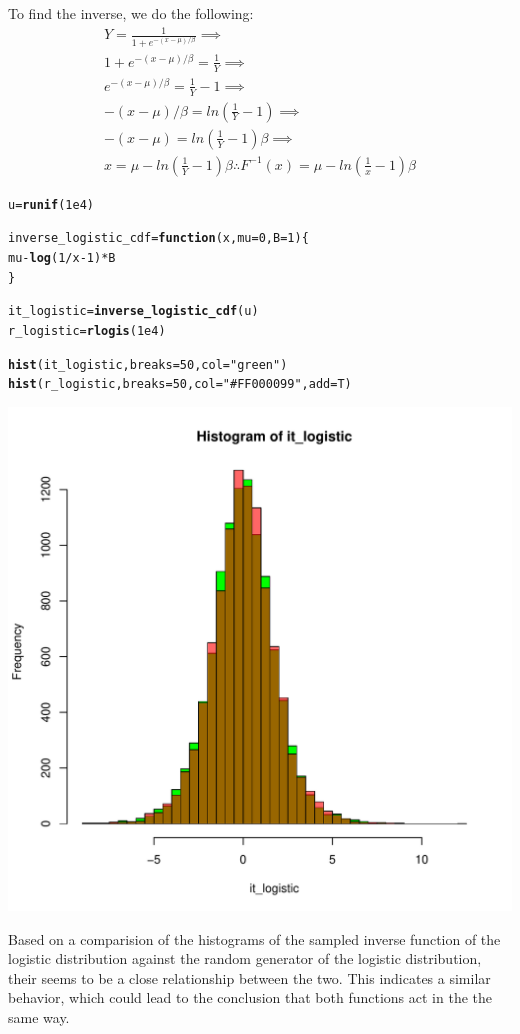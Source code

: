 \documentclass{article}\usepackage[]{graphicx}\usepackage[]{color}
\makeatletter
\newcommand{\hlnum}[1]{\textcolor[rgb]{0.686,0.059,0.569}{#1}}%
\newcommand{\hlstr}[1]{\textcolor[rgb]{0.192,0.494,0.8}{#1}}%
\newcommand{\hlopt}[1]{\textcolor[rgb]{0,0,0}{#1}}%
\newcommand{\hlstd}[1]{\textcolor[rgb]{0.345,0.345,0.345}{#1}}%
\newcommand{\hlkwa}[1]{\textcolor[rgb]{0.161,0.373,0.58}{\textbf{#1}}}%
\newcommand{\hlkwb}[1]{\textcolor[rgb]{0.69,0.353,0.396}{#1}}%
\newcommand{\hlkwc}[1]{\textcolor[rgb]{0.333,0.667,0.333}{#1}}%
\newcommand{\hlkwd}[1]{\textcolor[rgb]{0.737,0.353,0.396}{\textbf{#1}}}%
\newenvironment{kframe}{%
 \def\at@end@of@kframe{}%
 \ifinner\ifhmode%
  \def\at@end@of@kframe{\end{minipage}}%
  \begin{minipage}{\columnwidth}%
 \fi\fi%
 \def\FrameCommand##1{\hskip\@totalleftmargin \hskip-\fboxsep
 \colorbox{shadecolor}{##1}\hskip-\fboxsep
     \hskip-\linewidth \hskip-\@totalleftmargin \hskip\columnwidth}%
 \MakeFramed {\advance\hsize-\width
   \@totalleftmargin\z@ \linewidth\hsize
   \@setminipage}}%
 {\par\unskip\endMakeFramed%
 \at@end@of@kframe}
\newenvironment{knitrout}{}{} %
\makeatother
\begin{document}
To find the inverse, we do the following:
\begin{equation}
\begin{split}
Y = \frac{1}{1+e^{-(x-\mu)/\beta}} \implies\\
1+e^{-(x-\mu)/\beta} = \frac{1}{Y} \implies\\
e^{-(x-\mu)/\beta} = \frac{1}{Y} - 1 \implies\\
-(x-\mu)/\beta = ln(\frac{1}{Y} - 1) \implies\\
-(x-\mu) = ln(\frac{1}{Y} - 1)\beta \implies\\
x = \mu - ln(\frac{1}{Y} - 1)\beta
\therefore F^{-1}(x) = \mu - ln(\frac{1}{x} - 1)\beta
\end{split}
\end{equation}
\begin{knitrout}
\color{fgcolor}\begin{kframe}
\begin{alltt}
\hlstd{u} \hlkwb{=} \hlkwd{runif}\hlstd{(}\hlnum{1e4}\hlstd{)}

\hlstd{inverse_logistic_cdf} \hlkwb{=} \hlkwa{function}\hlstd{(}\hlkwc{x}\hlstd{,} \hlkwc{mu} \hlstd{=} \hlnum{0} \hlstd{,} \hlkwc{B} \hlstd{=} \hlnum{1}\hlstd{)\{}
  \hlstd{mu} \hlopt{-} \hlkwd{log}\hlstd{(}\hlnum{1}\hlopt{/}\hlstd{x}\hlopt{-}\hlnum{1}\hlstd{)}\hlopt{*}\hlstd{B}
\hlstd{\}}

\hlstd{it_logistic} \hlkwb{=} \hlkwd{inverse_logistic_cdf}\hlstd{(u)}
\hlstd{r_logistic} \hlkwb{=} \hlkwd{rlogis}\hlstd{(}\hlnum{1e4}\hlstd{)}

\hlkwd{hist}\hlstd{(it_logistic,} \hlkwc{breaks} \hlstd{=} \hlnum{50}\hlstd{,} \hlkwc{col} \hlstd{=} \hlstr{"green"}\hlstd{)}
\hlkwd{hist}\hlstd{(r_logistic,} \hlkwc{breaks} \hlstd{=} \hlnum{50}\hlstd{,} \hlkwc{col} \hlstd{=} \hlstr{"#FF000099"}\hlstd{,} \hlkwc{add} \hlstd{= T)}
\end{alltt}
\end{kframe}
\includegraphics[width=0.50\linewidth]{figure/unnamed-chunk-2-1} 

\end{knitrout}
Based on a comparision of the histograms of the sampled inverse function of the logistic distribution against the random generator of the logistic distribution, their seems to be a close relationship between the two. This indicates a similar behavior, which could lead to the conclusion that both functions act in the the same way. 
\end{document}
